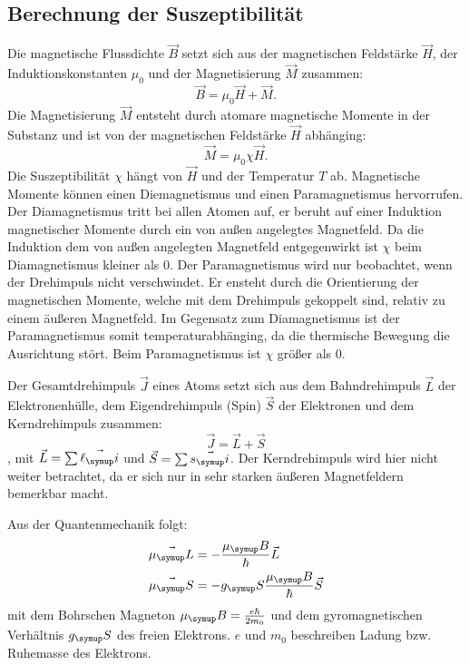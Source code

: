 \subsection{Berechnung der Suszeptibilität}
Die magnetische Flussdichte $\vec{B}$ setzt sich aus der magnetischen Feldstärke
$\vec{H}$, der Induktionskonstanten $\mu_0$ und der Magnetisierung $\vec{M}$
zusammen:
\begin{equation}
  \vec{B} = \mu_0 \vec{H} + \vec{M}.
\end{equation}
Die Magnetisierung $\vec{M}$ entsteht durch atomare magnetische Momente in der
Substanz und ist von der magnetischen Feldstärke $\vec{H}$ abhänging:
\begin{equation}
  \vec{M} = \mu_0 \chi \vec{H}.
\end{equation}
Die Suszeptibilität $\chi$ hängt von $\vec{H}$ und der Temperatur $T$ ab.
Magnetische Momente können einen Diemagnetismus und einen Paramagnetismus
hervorrufen. Der Diamagnetismus tritt bei allen Atomen auf, er beruht auf einer
Induktion magnetischer Momente durch ein von außen angelegtes Magnetfeld.
Da die Induktion dem von außen angelegten Magnetfeld entgegenwirkt ist $\chi$
beim Diamagnetismus kleiner als 0. Der Paramagnetismus wird nur beobachtet, wenn
der Drehimpuls nicht verschwindet. Er ensteht durch die Orientierung der
magnetischen Momente, welche mit dem Drehimpuls gekoppelt sind, relativ zu einem
äußeren Magnetfeld. Im Gegensatz zum Diamagnetismus ist der Paramagnetismus somit
temperaturabhänging, da die thermische Bewegung die Ausrichtung stört. Beim
Paramagnetismus ist $\chi$ größer als 0.

Der Gesamtdrehimpuls $\vec{J}$ eines Atoms setzt sich aus dem Bahndrehimpuls $\vec{L}$
der Elektronenhülle, dem Eigendrehimpuls (Spin) $\vec{S}$ der Elektronen und dem
Kerndrehimpuls zusammen:
\begin{equation}
  \vec{J} = \vec{L} + \vec{S}
\end{equation}
, mit $\vec{L} = \sum \vec{\ell_\su{i}}$ und $\vec{S} = \sum \vec{s_\su{i}}$.
Der Kerndrehimpuls wird hier nicht weiter betrachtet,
da er sich nur in sehr starken äußeren Magnetfeldern bemerkbar macht.

Aus der Quantenmechanik folgt:
\begin{align}
  \vec{\mu_\su{L}} &= -\frac{\mu_\su{B}}{\hbar} \vec{L} \\
  \vec{\mu_\su{S}} &= -g_\su{S}\frac{\mu_\su{B}}{\hbar} \vec{S}
\end{align}
mit dem Bohrschen Magneton $\mu_\su{B} = \frac{e \hbar}{2m_0}$ und dem
gyromagnetischen Verhältnis $g_\su{S}$ des freien Elektrons. $e$ und $m_0$
beschreiben Ladung bzw. Ruhemasse des Elektrons.

